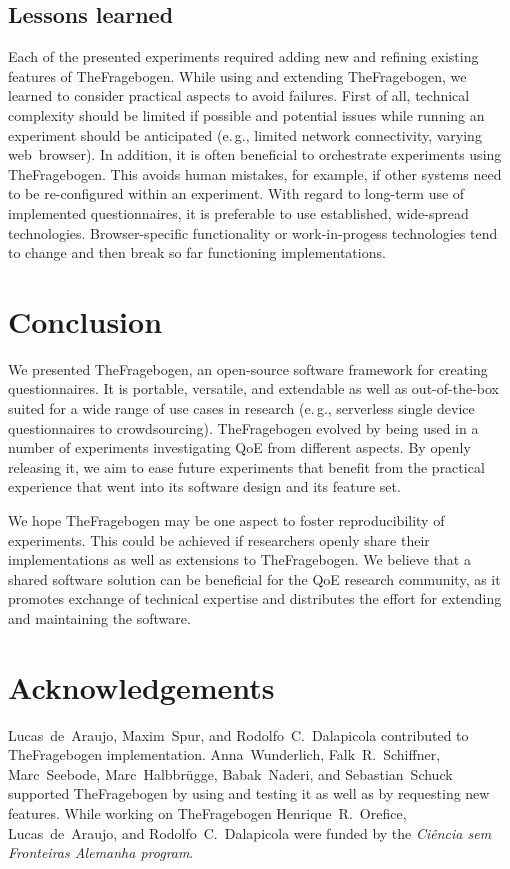 \documentclass[conference,a4paper]{IEEEtran}
\newcommand{\eg}{e.\,g.}
\begin{document}
\subsection{Lessons learned}
Each of the presented experiments required adding new and refining existing features of TheFragebogen.
While using and extending TheFragebogen, we learned to consider practical aspects to avoid failures.
First of all, technical complexity should be limited if possible and potential issues while running an experiment should be anticipated (\eg, limited network connectivity, varying web~browser).
In addition, it is often beneficial to orchestrate experiments using TheFragebogen.
This avoids human mistakes, for example, if other systems need
 to be re-configured within an experiment.
With regard to long-term use of implemented questionnaires, it is preferable to use established, wide-spread technologies.
Browser-specific functionality or work-in-progess technologies tend to change and then break so far functioning implementations.

\section{Conclusion}
We presented TheFragebogen, an open-source software framework for creating questionnaires.
It is portable, versatile, and extendable as well as out-of-the-box suited for a wide range of use cases in research (\eg, serverless single device questionnaires to crowdsourcing).
TheFragebogen evolved by being used in a number of experiments investigating QoE from different aspects.
By openly releasing it, we aim to ease future experiments that benefit from the practical experience that went into its software design and its feature set.

We hope TheFragebogen may be one aspect to foster reproducibility of experiments.
This could be achieved if researchers openly share their implementations as well as extensions to TheFragebogen.
We believe that a shared software solution can be beneficial for the QoE research community, as it promotes exchange of technical expertise and distributes the effort for extending and maintaining the software.

\section*{Acknowledgements}
Lucas~de~Araujo, Maxim~Spur, and Rodolfo~C.~Dalapicola contributed to TheFragebogen implementation.
Anna~Wunderlich, Falk~R.~Schiffner, Marc~Seebode, Marc~Halbbrügge, Babak~Naderi, and Sebastian~Schuck supported TheFragebogen by using and testing it as well as by requesting new features.
While working on TheFragebogen Henrique~R.~Orefice, Lucas~de~Araujo, and Rodolfo~C.~Dalapicola were funded by the \emph{Ci\^encia sem Fronteiras Alemanha program}. %



\end{document}
